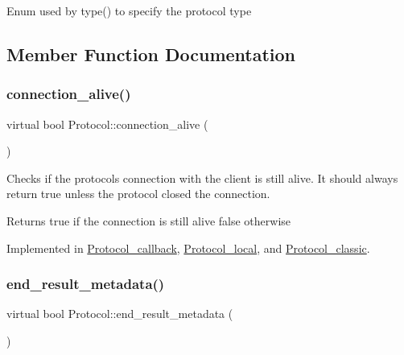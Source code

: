 Enum used by type() to specify the protocol type 

\subsection{Member Function Documentation}
\mbox{\label{classProtocol_af4ed0f36d7e3458766d522432bf4f2d5}} 
\subsubsection{\texorpdfstring{connection\+\_\+alive()}{connection\_alive()}}
{\footnotesize\ttfamily virtual bool Protocol\+::connection\+\_\+alive (\begin{DoxyParamCaption}{ }\end{DoxyParamCaption})\hspace{0.3cm}{\ttfamily [pure virtual]}}

Checks if the protocol\textquotesingle{}s connection with the client is still alive. It should always return true unless the protocol closed the connection.

\begin{DoxyReturn}{Returns}
true if the connection is still alive false otherwise 
\end{DoxyReturn}


Implemented in \mbox{\hyperlink{classProtocol__callback_a95428a9297fa1eda8fd44a5e1dba65a9}{Protocol\+\_\+callback}}, \mbox{\hyperlink{classProtocol__local_afdd93469cdacbec6cc7ac1a4379c7c40}{Protocol\+\_\+local}}, and \mbox{\hyperlink{classProtocol__classic_a76a10534621100f5f07105bc26fd6ada}{Protocol\+\_\+classic}}.

\mbox{\label{classProtocol_a48bb540f0317bf418c129f441f2e82b9}} 
\subsubsection{\texorpdfstring{end\+\_\+result\+\_\+metadata()}{end\_result\_metadata()}}
{\footnotesize\ttfamily virtual bool Protocol\+::end\+\_\+result\+\_\+metadata (\begin{DoxyParamCaption}{ }\end{DoxyParamCaption})\hspace{0.3cm}{\ttfamily [pure virtual]}}


